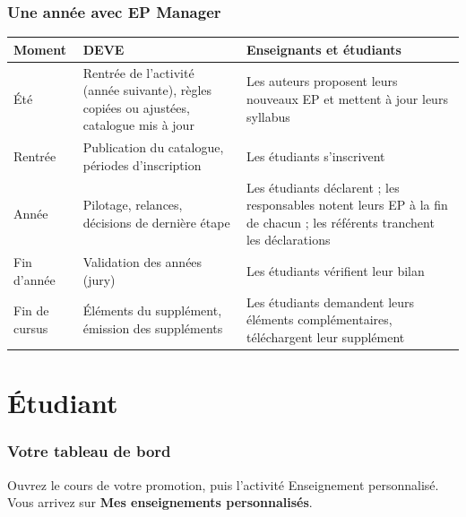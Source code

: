 \documentclass[11pt,a4paper]{article}
\begin{document}
\section{Une année avec EP Manager}\label{sec:calendrier}

\begin{center}
\begin{tabularx}{\linewidth}{@{}l X X@{}}
\toprule
\textbf{Moment} & \textbf{DEVE} & \textbf{Enseignants et étudiants} \\
\midrule
Été & Rentrée de l'activité (année suivante), règles copiées ou ajustées, catalogue mis à
jour & Les auteurs proposent leurs nouveaux EP et mettent à jour leurs syllabus \\
Rentrée & Publication du catalogue, périodes d'inscription & Les étudiants s'inscrivent \\
Année & Pilotage, relances, décisions de dernière étape & Les étudiants déclarent ; les
responsables notent leurs EP à la fin de chacun ; les référents tranchent les déclarations \\
Fin d'année & Validation des années (jury) & Les étudiants vérifient leur bilan \\
Fin de cursus & Éléments du supplément, émission des suppléments & Les étudiants demandent
leurs éléments complémentaires, téléchargent leur supplément \\
\bottomrule
\end{tabularx}
\end{center}

\newpage
\part{Étudiant}\label{part:etudiant}

\section{Votre tableau de bord}

Ouvrez le cours de votre promotion, puis l'activité \og Enseignement personnalisé\fg{}. Vous
arrivez sur \textbf{Mes enseignements personnalisés}.

\end{document}
